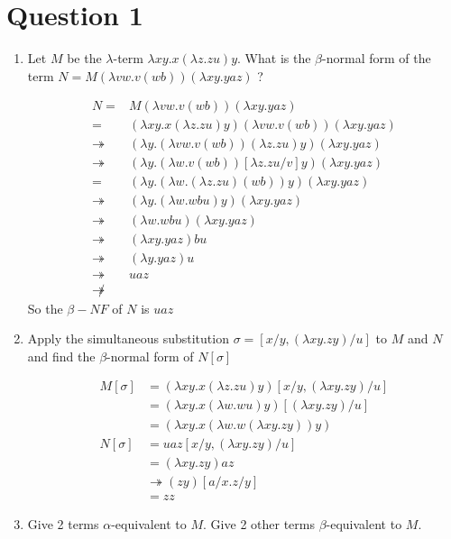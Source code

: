 \documentclass[10pt,\jkfside,a4paper]{article}
\begin{document}
\section{Question 1}
\begin{enumerate}[label=(\alph*)]

\item Let $M$ be the $\lambda$-term $\lambda xy.x(\lambda z.zu)y$. What is
the $\beta$-normal form of the term $N = M(\lambda vw.v(wb))(\lambda xy.yaz)$ ?

\begin{align*}
N =& M(\lambda vw.v(wb))(\lambda xy.yaz) \\
=& (\lambda xy.x(\lambda z.zu)y)(\lambda vw.v(wb))(\lambda xy.yaz) \\
\twoheadrightarrow& (\lambda y.(\lambda vw.v(wb))(\lambda z.zu)y)(\lambda
xy.yaz) \\
\twoheadrightarrow& (\lambda y.(\lambda w.v(wb))[\lambda z.zu/v]y)
(\lambda xy.yaz) \\
=& (\lambda y.(\lambda w.(\lambda z.zu)(wb))y)(\lambda xy.yaz) \\
\twoheadrightarrow& (\lambda y.(\lambda w.wbu)y)(\lambda xy.yaz) \\
\twoheadrightarrow& (\lambda w.wbu)(\lambda xy.yaz) \\
\twoheadrightarrow& (\lambda xy.yaz)bu \\
\twoheadrightarrow& (\lambda y. yaz)u \\
\twoheadrightarrow& uaz \\
\not\twoheadrightarrow&
\end{align*}
So the $\beta-NF$ of $N$ is $uaz$
\item Apply the simultaneous substitution $\sigma = [x/y, (\lambda xy.zy)/u]$
to $M$ and $N$ and find the $\beta$-normal form of $N[\sigma]$

\begin{align*}
M[\sigma]
&= (\lambda xy.x(\lambda z.zu)y)[x/y, (\lambda xy.zy)/u] \\
&= (\lambda xy.x(\lambda w.wu)y)[(\lambda xy.zy)/u] \\
&= (\lambda xy.x(\lambda w.w(\lambda xy.zy))y)\\
N[\sigma]
&= uaz[x/y, (\lambda xy.zy)/u] \\
&= (\lambda xy.zy)az \\
&\twoheadrightarrow (zy)[a/x. z/y] \\
&= zz
\end{align*}

\item Give 2 terms $\alpha$-equivalent to $M$. Give 2 other terms
$\beta$-equivalent to $M$.


\end{enumerate}
\end{document}
